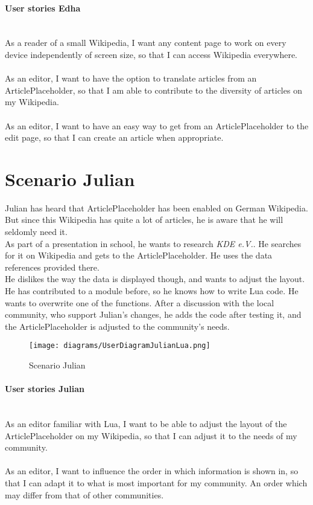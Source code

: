 \paragraph{User stories Edha} ~\\
As a reader of a small Wikipedia, I want any content page to work on every device independently of screen size, so that I can access Wikipedia everywhere. \\
\\
As an editor, I want to have the option to translate articles from an ArticlePlaceholder, so that I am able to contribute to the diversity of articles on my Wikipedia. \\
\\
As an editor, I want to have an easy way to get from an ArticlePlaceholder to the edit page, so that I can create an article when appropriate. 

\section{Scenario Julian}
Julian has heard that ArticlePlaceholder has been enabled on German Wikipedia. But since this Wikipedia has quite a lot of articles, he is aware that he will seldomly need it. \\
As part of a presentation in school, he wants to research \textit{KDE e.V.}. He searches for it on Wikipedia and gets to the ArticlePlaceholder. He uses the data references provided there. \\
He dislikes the way the data is displayed though, and wants to adjust the layout. He has contributed to a module before, so he knows how to write Lua code. He wants to overwrite one of the functions. After a discussion with the local community, who support Julian's changes, he adds the code after testing it, and the ArticlePlaceholder is adjusted to the community's needs.

\begin{figure}[H]
	\centering
	\texttt{[image: diagrams/UserDiagramJulianLua.png]}
	\caption{Scenario Julian}
	\label{fig:ScenarioJulian}
\end{figure}

\paragraph{User stories Julian} ~\\
As an editor familiar with Lua, I want to be able to adjust the layout of the ArticlePlaceholder on my Wikipedia, so that I can adjust it to the needs of my community. \\
\\
As an editor, I want to influence the order in which information is shown in, so that I can adapt it to what is most important for my community. An order which may differ from that of other communities.

